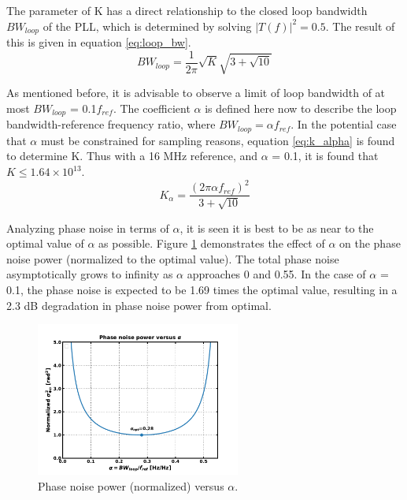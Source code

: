 			The parameter of K has a direct relationship to the closed loop bandwidth $BW_{loop}$ of the PLL, which is determined by solving $|T(f)|^2 = 0.5$. The result of this is given in equation \ref{eq:loop_bw}. 
			\begin{equation}\label{eq:loop_bw} 
				BW_{loop} = \frac{1}{2\pi}\sqrt{K}\sqrt{3+
				\sqrt{10}} 
			\end{equation} 

			As mentioned before, it is advisable to observe a limit of loop bandwidth of at most $BW_{loop}$ = 0.1$f_{ref}$. The coefficient $\alpha$ is defined here now to describe the loop bandwidth-reference frequency ratio, where $BW_{loop} = \alpha f_{ref}$. In the potential case that $\alpha$ must be constrained for sampling reasons, equation \ref{eq:k_alpha} is found to determine K. Thus with a 16 MHz reference, and $\alpha$ = 0.1, it is found that $K \leq 1.64\times10^{13}$. 
			\begin{equation}\label{eq:k_alpha} 
				K_\alpha = \frac{(2\pi\alpha f_{ref})^2}{3 + \sqrt{10}} 
			\end{equation}

			Analyzing phase noise in terms of $\alpha$, it is seen it is best to be as near to the optimal value of $\alpha$ as possible. Figure \ref{fig:alpha_v_pn} demonstrates the effect of $\alpha$ on the phase noise power (normalized to the optimal value). The total phase noise asymptotically grows to infinity as $\alpha$ approaches 0 and 0.55. In the case of $\alpha$ = 0.1, the phase noise is expected to be 1.69 times the optimal value, resulting in a 2.3 dB degradation in phase noise power from optimal.

			\begin{figure}[htb!]
				\center\includegraphics[width=0.6\textwidth, angle=0]{./figs/design/alpha_v_pn}
				\caption{Phase noise power (normalized) versus $\alpha$.}
				\label{fig:alpha_v_pn}
			\end{figure}

